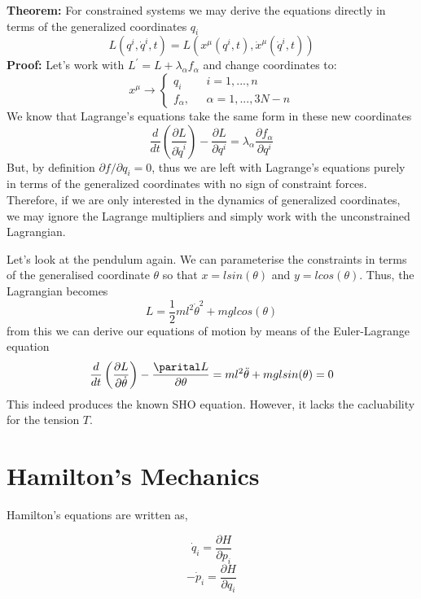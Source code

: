 \begin{tcolorbox}
    \textbf{Theorem:} For constrained systems we may derive the equations directly in terms of the generalized coordinates $q_{i}$
    \begin{equation}
        L(q^{i},\dot{q}^{i}, t) = L(x^{\mu}(q^{i},t),\dot{x}^{\mu}(\dot{q}^{i}, t))
    \end{equation}
    \textbf{Proof:} Let's work with $L^{'} = L + \lambda_{\alpha}f_{\alpha}$ and change coordinates to:
    \begin{equation}
    x^{\mu} \rightarrow 
        \begin{cases}
            q_{i} \ \ \ & i = 1,...,n\\
f_{\alpha},            \ \ \  & \alpha = 1,...,3N-n
        \end{cases}
    \end{equation}
    We know that Lagrange's equations take the same form in these new coordinates
    \begin{equation}
        \frac{d}{dt}\left( \frac{\partial L}{\partial \dot{q}^{i}} \right) - \frac{\partial L}{\partial q^{i}} = \lambda_{\alpha} \frac{\partial f_{\alpha}}{\partial q^{i}}
    \end{equation}
    But, by definition $\partial f/\partial q_{i} = 0$, thus we are left with Lagrange's equations purely in terms of the generalized coordinates with no sign of constraint forces. Therefore, if we are only interested in the dynamics of generalized coordinates, we may ignore the Lagrange multipliers and simply work with the unconstrained Lagrangian.
\end{tcolorbox}
Let's look at the pendulum again. We can parameterise the constraints in terms of the generalised coordinate $\theta$ so that $x = l sin(\theta)$ and $y = l cos(\theta)$. Thus, the Lagrangian becomes
\begin{equation}
    L  = \frac{1}{2}ml^{2}\dot{\theta}^{2} + mgl cos(\theta)
\end{equation}
from this we can derive our equations of motion by means of the Euler-Lagrange equation
\begin{equation}
    \frac{d}{dt}\left(\frac{\partial L}{\partial \dot{\theta}}\right) - \frac{\parital L}{\partial \theta} = ml^{2}\ddot{\theta} + mgl sin(\theta) = 0
\end{equation}
This indeed produces the known SHO equation.    However, it lacks the cacluability for the tension $T$.
\section{Hamilton's Mechanics}
Hamilton's equations are written as,
\begin{tcolorbox}
	\begin{equation}
\dot{q}_{i} = \frac{\partial H}{\partial p_{i}}
\end{equation}
\begin{equation}
-\dot{p}_{i} = \frac{\partial H}{\partial q_{i}}
\end{equation}
\end{tcolorbox}
	
